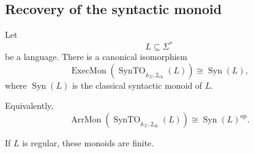 \subsection{Recovery of the syntactic monoid}
\label{subsec:to-recovery-syntactic-monoid}

\begin{theorem}
\label{thm:to-classical-syntactic-monoid}
    Let
    \[
        L\subseteq\Sigma^*
    \]
    be a language. There is a canonical isomorphism
    \[
        \operatorname{ExecMon}
        \left(
            \operatorname{SynTO}_{\mathbb A_\Sigma,2_{\mathrm{ch}}}(L)
        \right)
        \cong
        \operatorname{Syn}(L),
    \]
    where \(\operatorname{Syn}(L)\) is the classical syntactic monoid of
    \(L\).

    Equivalently,
    \[
        \operatorname{ArrMon}
        \left(
            \operatorname{SynTO}_{\mathbb A_\Sigma,2_{\mathrm{ch}}}(L)
        \right)
        \cong
        \operatorname{Syn}(L)^{\mathrm{op}}.
    \]

    If \(L\) is regular, these monoids are finite.
\end{theorem}


